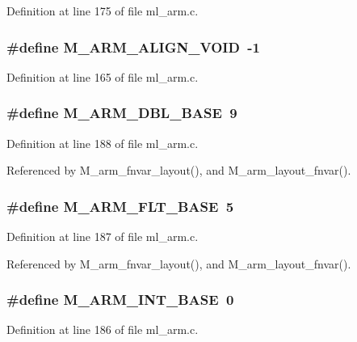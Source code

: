 Definition at line 175 of file ml\_\-arm.c.
\subsubsection{\setlength{\rightskip}{0pt plus 5cm}\#define M\_\-ARM\_\-ALIGN\_\-VOID~-1}\label{ml__arm_8c_c8257c08c4d04def62e79d8e48d2f789}




Definition at line 165 of file ml\_\-arm.c.
\subsubsection{\setlength{\rightskip}{0pt plus 5cm}\#define M\_\-ARM\_\-DBL\_\-BASE~9}\label{ml__arm_8c_3586dbbaf419bd64e8530a397a5fcc72}




Definition at line 188 of file ml\_\-arm.c.

Referenced by M\_\-arm\_\-fnvar\_\-layout(), and M\_\-arm\_\-layout\_\-fnvar().
\subsubsection{\setlength{\rightskip}{0pt plus 5cm}\#define M\_\-ARM\_\-FLT\_\-BASE~5}\label{ml__arm_8c_872d58440b88c3bb5c11b3441989177f}




Definition at line 187 of file ml\_\-arm.c.

Referenced by M\_\-arm\_\-fnvar\_\-layout(), and M\_\-arm\_\-layout\_\-fnvar().
\subsubsection{\setlength{\rightskip}{0pt plus 5cm}\#define M\_\-ARM\_\-INT\_\-BASE~0}\label{ml__arm_8c_6c461d5f9c6aaeada90caaec8ca1e559}




Definition at line 186 of file ml\_\-arm.c.

